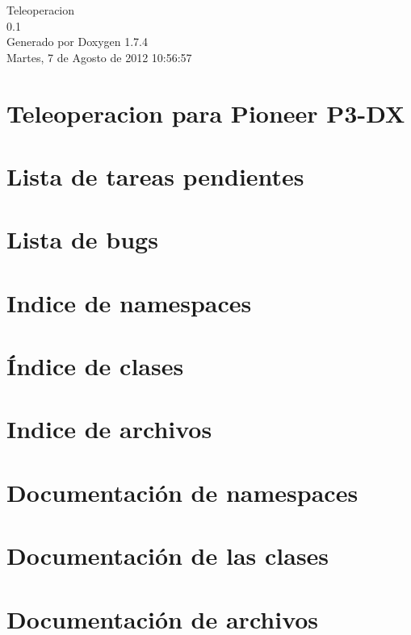 \documentclass[a4paper]{book}
\begin{document}
\hypersetup{pageanchor=false}
\begin{titlepage}
\vspace*{7cm}
\begin{center}
{\Large Teleoperacion \\[1ex]\large 0.1 }\\
\vspace*{1cm}
{\large Generado por Doxygen 1.7.4}\\
\vspace*{0.5cm}
{\small Martes, 7 de Agosto de 2012 10:56:57}\\
\end{center}
\end{titlepage}
\clearemptydoublepage
{}
\tableofcontents
\clearemptydoublepage
{}
\hypersetup{pageanchor=true}
\chapter{Teleoperacion para Pioneer P3-\/DX}
\label{index}\hypertarget{index}{}
\chapter{Lista de tareas pendientes}
\label{todo}
\hypertarget{todo}{}

\chapter{Lista de bugs}
\label{bug}
\hypertarget{bug}{}

\chapter{Indice de namespaces}

\chapter{Índice de clases}

\chapter{Indice de archivos}

\chapter{Documentación de namespaces}



\chapter{Documentación de las clases}


\chapter{Documentación de archivos}




\printindex
\end{document}
